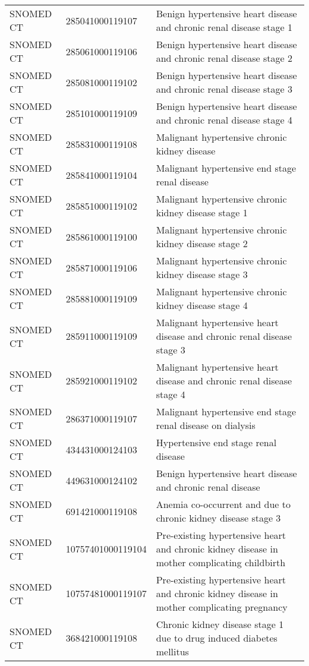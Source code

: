 \begin{longtable}{p{}p{}p{}}
  SNOMED CT & 285041000119107 & Benign hypertensive heart disease and chronic renal disease stage 1 \\ 
  SNOMED CT & 285061000119106 & Benign hypertensive heart disease and chronic renal disease stage 2 \\ 
  SNOMED CT & 285081000119102 & Benign hypertensive heart disease and chronic renal disease stage 3 \\ 
  SNOMED CT & 285101000119109 & Benign hypertensive heart disease and chronic renal disease stage 4 \\ 
  SNOMED CT & 285831000119108 & Malignant hypertensive chronic kidney disease \\ 
  SNOMED CT & 285841000119104 & Malignant hypertensive end stage renal disease \\ 
  SNOMED CT & 285851000119102 & Malignant hypertensive chronic kidney disease stage 1 \\ 
  SNOMED CT & 285861000119100 & Malignant hypertensive chronic kidney disease stage 2 \\ 
  SNOMED CT & 285871000119106 & Malignant hypertensive chronic kidney disease stage 3 \\ 
  SNOMED CT & 285881000119109 & Malignant hypertensive chronic kidney disease stage 4 \\ 
  SNOMED CT & 285911000119109 & Malignant hypertensive heart disease and chronic renal disease stage 3 \\ 
  SNOMED CT & 285921000119102 & Malignant hypertensive heart disease and chronic renal disease stage 4 \\ 
  SNOMED CT & 286371000119107 & Malignant hypertensive end stage renal disease on dialysis \\ 
  SNOMED CT & 434431000124103 & Hypertensive end stage renal disease \\ 
  SNOMED CT & 449631000124102 & Benign hypertensive heart disease and chronic renal disease \\ 
  SNOMED CT & 691421000119108 & Anemia co-occurrent and due to chronic kidney disease stage 3 \\ 
  SNOMED CT & 10757401000119104 & Pre-existing hypertensive heart and chronic kidney disease in mother complicating childbirth \\ 
  SNOMED CT & 10757481000119107 & Pre-existing hypertensive heart and chronic kidney disease in mother complicating pregnancy \\ 
  SNOMED CT & 368421000119108 & Chronic kidney disease stage 1 due to drug induced diabetes mellitus \\ 

\end{longtable}
